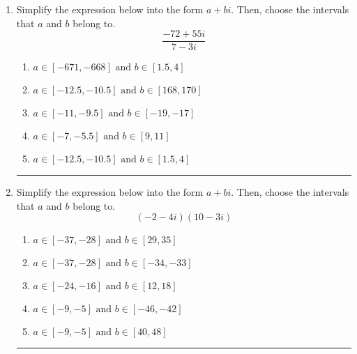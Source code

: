 \documentclass[14pt]{extbook}
\newcommand{\litem}[1]{\item#1\hspace*{-1cm}\rule{\textwidth}{0.4pt}}
\begin{document}
\begin{enumerate}
{\begin{enumerate}[label=\Alph*.]
\end{enumerate} }
\litem{
Simplify the expression below into the form $a+bi$. Then, choose the intervals that $a$ and $b$ belong to.\[ \frac{-72 + 55 i}{7 - 3 i} \]\begin{enumerate}[label=\Alph*.]
\item \( a \in [-671, -668] \text{ and } b \in [1.5, 4] \)
\item \( a \in [-12.5, -10.5] \text{ and } b \in [168, 170] \)
\item \( a \in [-11, -9.5] \text{ and } b \in [-19, -17] \)
\item \( a \in [-7, -5.5] \text{ and } b \in [9, 11] \)
\item \( a \in [-12.5, -10.5] \text{ and } b \in [1.5, 4] \)

\end{enumerate} }
\litem{
Simplify the expression below into the form $a+bi$. Then, choose the intervals that $a$ and $b$ belong to.\[ (-2 - 4 i)(10 - 3 i) \]\begin{enumerate}[label=\Alph*.]
\item \( a \in [-37, -28] \text{ and } b \in [29, 35] \)
\item \( a \in [-37, -28] \text{ and } b \in [-34, -33] \)
\item \( a \in [-24, -16] \text{ and } b \in [12, 18] \)
\item \( a \in [-9, -5] \text{ and } b \in [-46, -42] \)
\item \( a \in [-9, -5] \text{ and } b \in [40, 48] \)

\end{enumerate} }
\end{enumerate}
\end{document}
